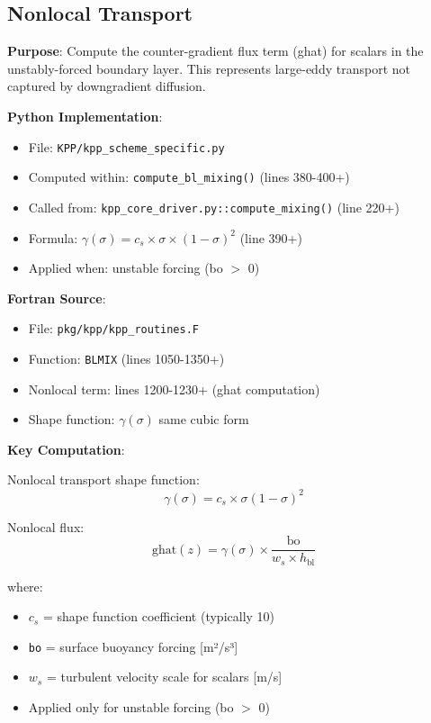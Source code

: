 \documentclass[11pt]{article}
\begin{document}
\subsection{Nonlocal Transport}

\textbf{Purpose}: Compute the counter-gradient flux term (ghat) for scalars in the unstably-forced boundary layer. This represents large-eddy transport not captured by downgradient diffusion.

\textbf{Python Implementation}:
\begin{itemize}
    \item File: \verb|KPP/kpp_scheme_specific.py|
    \item Computed within: \verb|compute_bl_mixing()| (lines 380-400+)
    \item Called from: \verb|kpp_core_driver.py::compute_mixing()| (line 220+)
    \item Formula: $\gamma(\sigma) = c_s \times \sigma \times (1 - \sigma)^2$ (line 390+)
    \item Applied when: unstable forcing (bo $>$ 0)
\end{itemize}

\textbf{Fortran Source}:
\begin{itemize}
    \item File: \verb|pkg/kpp/kpp_routines.F|
    \item Function: \verb|BLMIX| (lines 1050-1350+)
    \item Nonlocal term: lines 1200-1230+ (ghat computation)
    \item Shape function: $\gamma(\sigma)$ same cubic form
\end{itemize}

\textbf{Key Computation}:

Nonlocal transport shape function:
\begin{equation}
\gamma(\sigma) = c_s \times \sigma (1 - \sigma)^2
\end{equation}

Nonlocal flux:
\begin{equation}
\text{ghat}(z) = \gamma(\sigma) \times \frac{\text{bo}}{w_s \times h_{\text{bl}}}
\end{equation}

where:
\begin{itemize}
    \item $c_s$ = shape function coefficient (typically 10)
    \item \verb|bo| = surface buoyancy forcing [m²/s³]
    \item $w_s$ = turbulent velocity scale for scalars [m/s]
    \item Applied only for unstable forcing (bo $>$ 0)
\end{itemize}
\end{document}
